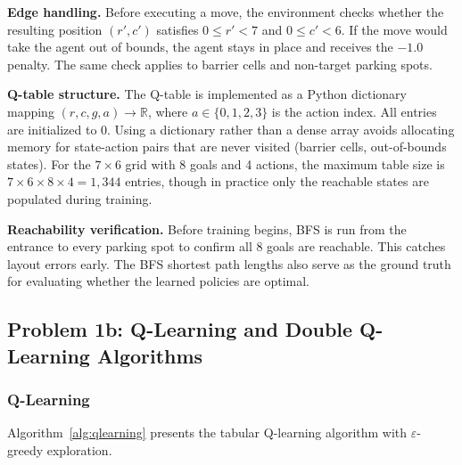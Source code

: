 \documentclass[letterpaper]{article}
\begin{document}
\textbf{Edge handling.} Before executing a move, the environment checks whether the resulting position $(r', c')$ satisfies $0 \le r' < 7$ and $0 \le c' < 6$. If the move would take the agent out of bounds, the agent stays in place and receives the $-1.0$ penalty. The same check applies to barrier cells and non-target parking spots.

\textbf{Q-table structure.} The Q-table is implemented as a Python dictionary mapping $(r, c, g, a) \to \mathbb{R}$, where $a \in \{0, 1, 2, 3\}$ is the action index. All entries are initialized to 0. Using a dictionary rather than a dense array avoids allocating memory for state-action pairs that are never visited (barrier cells, out-of-bounds states). For the $7 \times 6$ grid with 8 goals and 4 actions, the maximum table size is $7 \times 6 \times 8 \times 4 = 1{,}344$ entries, though in practice only the reachable states are populated during training.

\textbf{Reachability verification.} Before training begins, BFS is run from the entrance to every parking spot to confirm all 8 goals are reachable. This catches layout errors early. The BFS shortest path lengths also serve as the ground truth for evaluating whether the learned policies are optimal.

\subsection{Problem 1b: Q-Learning and Double Q-Learning Algorithms}

\subsubsection{Q-Learning}

Algorithm~\ref{alg:qlearning} presents the tabular Q-learning algorithm with $\varepsilon$-greedy exploration.
\end{document}
